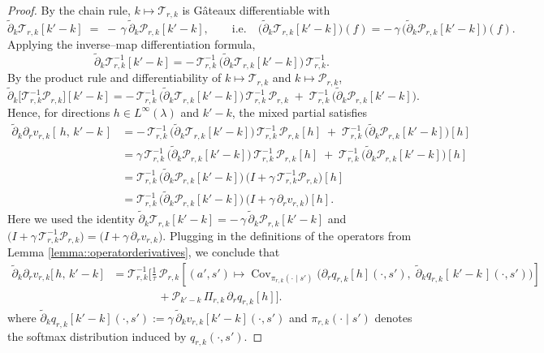 \documentclass[11pt]{article}
\newcommand{\adk}{\widetilde{\partial}_k}
\theoremstyle{plain}
\begin{document}
\begin{proof}
By the chain rule, \(k \mapsto \mathcal{T}_{r,k}\) is Gâteaux differentiable with
\[
\adk \mathcal{T}_{r,k}[k'-k] \;=\; -\,\gamma\,\adk \mathcal{P}_{r,k}[k'-k],
\qquad\text{i.e.}\quad
\big(\adk \mathcal{T}_{r,k}[k'-k]\big)(f)
= -\,\gamma\,\big(\adk \mathcal{P}_{r,k}[k'-k]\big)(f).
\]
Applying the inverse–map differentiation formula,
\[
\adk \mathcal{T}_{r,k}^{-1}[k'-k]
= -\,\mathcal{T}_{r,k}^{-1}\,\big(\adk \mathcal{T}_{r,k}[k'-k]\big)\,\mathcal{T}_{r,k}^{-1}.
\]
By the product rule and differentiability of \(k\mapsto \mathcal{T}_{r,k}\) and \(k\mapsto \mathcal{P}_{r,k}\),
\[
\adk\!\big[\mathcal{T}_{r,k}^{-1}\mathcal{P}_{r,k}\big][k'-k]
= -\,\mathcal{T}_{r,k}^{-1}\,\big(\adk \mathcal{T}_{r,k}[k'-k]\big)\,\mathcal{T}_{r,k}^{-1}\,\mathcal{P}_{r,k}
\;+\;
\mathcal{T}_{r,k}^{-1}\,\big(\adk \mathcal{P}_{r,k}[k'-k]\big).
\]
Hence, for directions $h\in L^\infty(\lambda)$ and
$k' - k$, the mixed partial satisfies
\begin{align*}
\adk\partial_r v_{r,k}[\,h,\,k' - k\,]
&= -\,\mathcal{T}_{r,k}^{-1}\,\big(\adk \mathcal{T}_{r,k}[k' - k]\big)\,
     \mathcal{T}_{r,k}^{-1}\,\mathcal{P}_{r,k}[h]
 \;+\; \mathcal{T}_{r,k}^{-1}\,\big(\adk \mathcal{P}_{r,k}[k' - k]\big)[h] \\
&= \gamma\,\mathcal{T}_{r,k}^{-1}\,\big(\adk \mathcal{P}_{r,k}[k' - k]\big)\,
      \mathcal{T}_{r,k}^{-1}\,\mathcal{P}_{r,k}[h]
 \;+\; \mathcal{T}_{r,k}^{-1}\,\big(\adk \mathcal{P}_{r,k}[k' - k]\big)[h] \\
&= \mathcal{T}_{r,k}^{-1}\,\big(\adk \mathcal{P}_{r,k}[k' - k]\big)\,
   \big(I+\gamma\,\mathcal{T}_{r,k}^{-1}\mathcal{P}_{r,k}\big)[h] \\
&= \mathcal{T}_{r,k}^{-1}\,\big(\adk \mathcal{P}_{r,k}[k' - k]\big)\,
   \big(I+\gamma\,\partial_r v_{r,k}\big)[h].
\end{align*}
Here we used the identity $\adk \mathcal{T}_{r,k}[k' - k] = -\,\gamma\,\adk \mathcal{P}_{r,k}[k' - k]$ and
$\big(I+\gamma\,\mathcal{T}_{r,k}^{-1}\mathcal{P}_{r,k}\big)=\big(I+\gamma\,\partial_r v_{r,k}\big)$.
Plugging in the definitions of the operators from Lemma \ref{lemma::operatorderivatives}, we conclude that
\[
\begin{aligned}
\adk\partial_r v_{r,k}\big[\,h,\,k'-k\,\big]
&= \mathcal{T}_{r,k}^{-1}\Bigg[
\frac{1}{\tau}\,\mathcal{P}_{r,k}\!\left[(a',s')\mapsto
\operatorname{Cov}_{\pi_{r,k}(\cdot\mid s')}\!\Big(
\partial_r q_{r,k}[h](\cdot,s'),\; \adk q_{r,k}[\,k'-k\,](\cdot,s')
\Big)\right] \\
&\qquad\qquad
+ \mathcal{P}_{k'-k}\,\Pi_{r,k}\,\partial_r q_{r,k}[h]
\Bigg].
\end{aligned}
\]
where $\adk q_{r,k}[k' - k](\cdot,s') := \gamma\,\adk v_{r,k}[k' - k](\cdot,s')$ and
$\pi_{r,k}(\cdot\mid s')$ denotes the softmax distribution induced by $q_{r,k}(\cdot,s')$.







\end{proof}
\end{document}
